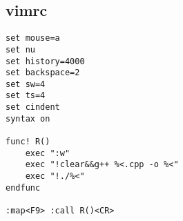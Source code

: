\subsection{vimrc}
\begin{lstlisting}
set mouse=a
set nu
set history=4000
set backspace=2
set sw=4
set ts=4
set cindent
syntax on

func! R()
	exec ":w"
	exec "!clear&&g++ %<.cpp -o %<"
	exec "!./%<"
endfunc

:map<F9> :call R()<CR>
\end{lstlisting}

